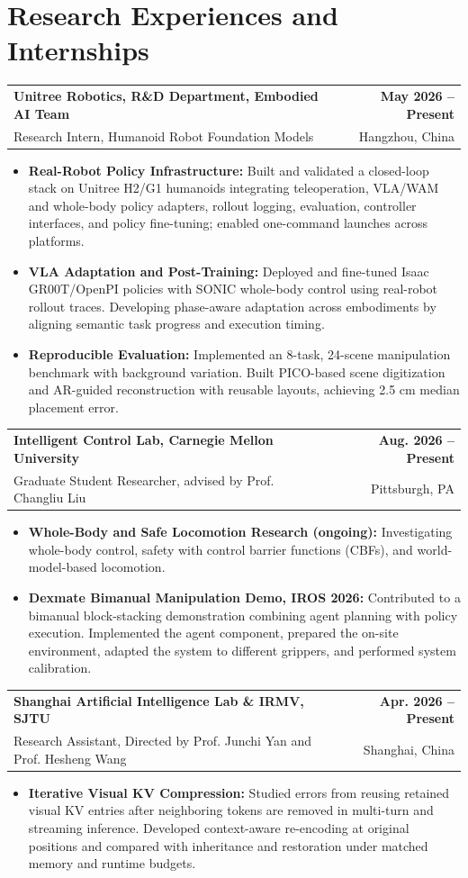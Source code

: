 \documentclass[11pt,letterpaper]{article}
\makeatletter
\newcommand{\resumeSubheading}[4]{
    \begin{tabularx}{\textwidth}{@{}Xr@{}}
        \textbf{#1} & \textbf{#2} \\
        #3 & #4 \\
    \end{tabularx}
}
\newcommand{\resumeItem}[1]{
    \item #1
}
\makeatother
\begin{document}
\section*{Research Experiences and Internships}
\resumeSubheading
{ Unitree Robotics, R\&D Department, Embodied AI Team}
{May 2026 -- Present}
{\hspace*{1.4em}Research Intern, Humanoid Robot Foundation Models}
{Hangzhou, China}
\begin{itemize}[leftmargin=2.4em, itemsep=0.5pt, topsep=0pt]
\small
\resumeItem{\textbf{Real-Robot Policy Infrastructure:} Built and validated a closed-loop stack on Unitree H2/G1 humanoids integrating teleoperation, VLA/WAM and whole-body policy adapters, rollout logging, evaluation, controller interfaces, and policy fine-tuning; enabled one-command launches across platforms.}
\resumeItem{\textbf{VLA Adaptation and Post-Training:} Deployed and fine-tuned Isaac GR00T/OpenPI policies with SONIC whole-body control using real-robot rollout traces. Developing phase-aware adaptation across embodiments by aligning semantic task progress and execution timing.}
\resumeItem{\textbf{Reproducible Evaluation:} Implemented an 8-task, 24-scene manipulation benchmark with background variation. Built PICO-based scene digitization and AR-guided reconstruction with reusable layouts, achieving 2.5 cm median placement error.}
\end{itemize}

\resumeSubheading
{Intelligent Control Lab, Carnegie Mellon University}
{Aug. 2026 -- Present}
{\hspace*{1.4em}Graduate Student Researcher, advised by Prof. Changliu Liu}
{Pittsburgh, PA}
\begin{itemize}[leftmargin=2.4em, itemsep=0.5pt, topsep=0pt]
\small
\resumeItem{\textbf{Whole-Body and Safe Locomotion Research (ongoing):} Investigating whole-body control, safety with control barrier functions (CBFs), and world-model-based locomotion.}
\resumeItem{\textbf{Dexmate Bimanual Manipulation Demo, IROS 2026:} Contributed to a bimanual block-stacking demonstration combining agent planning with policy execution. Implemented the agent component, prepared the on-site environment, adapted the system to different grippers, and performed system calibration.}
\end{itemize}

\resumeSubheading
{Shanghai Artificial Intelligence Lab \& IRMV, SJTU }
{Apr. 2026 -- Present}
{\hspace*{1.4em}Research Assistant, Directed by Prof. Junchi Yan and Prof. Hesheng Wang}
{Shanghai, China}
\begin{itemize}[leftmargin=2.4em, itemsep=0.5pt, topsep=0pt]
\small
\resumeItem{\textbf{Iterative Visual KV Compression:} Studied errors from reusing retained visual KV entries after neighboring tokens are removed in multi-turn and streaming inference. Developed context-aware re-encoding at original positions and compared with inheritance and restoration under matched memory and runtime budgets.}
\end{itemize}
\end{document}
